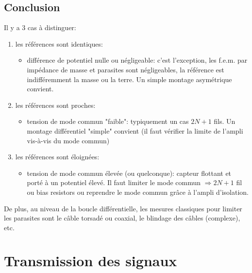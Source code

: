 \subsection{Conclusion}
Il y a 3 cas à distinguer:
\begin{enumerate}
	\item les références sont identiques:
	\begin{itemize}
		\item différence de potentiel nulle ou négligeable: c'est l'exception, les f.e.m. par impédance de masse et parasites sont négligeables, la référence est indifféremment la masse ou la terre. Un simple montage asymétrique convient.
	\end{itemize}
	\item les références sont proches:
	\begin{itemize}
		\item tension de mode commun "faible": typiquement un cas \(2N+1\) fils. Un montage différentiel "simple" convient (il faut vérifier la limite de l'ampli vis-à-vis du mode commun)
	\end{itemize}
	\item les références sont éloignées:
	\begin{itemize}
		\item tension de mode commun élevée (ou quelconque): capteur flottant et porté à un potentiel élevé. Il faut limiter le mode commun \(\Rightarrow 2N+1\) fil ou bias resistors ou reprendre le mode commun grâce à l'ampli d'isolation.
	\end{itemize}
\end{enumerate}
De plus, au niveau de la boucle différentielle, les mesures classiques pour limiter les parasites sont le câble torsadé ou coaxial, le blindage des câbles (complexe), etc.
\section{Transmission des signaux}